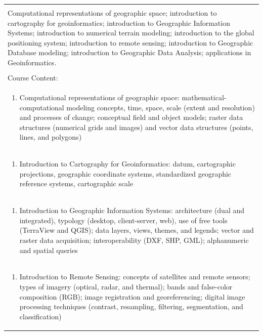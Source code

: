 \documentclass[11pt]{article}
\begin{document}
\begin{center}
\begin{longtable}{|p{4cm}|p{4cm}|p{4cm}|p{4cm}|}
\multicolumn{4}{|p{16cm}|}{}\\
\multicolumn{4}{|p{\dimexpr 16cm + 6\tabcolsep\relax}|}{Computational representations of geographic space; introduction to cartography for geoinformatics; introduction to Geographic Information Systems; introduction to numerical terrain modeling; introduction to the global positioning system; introduction to remote sensing; introduction to Geographic Database modeling; introduction to Geographic Data Analysis; applications in Geoinformatics.}\\
\multicolumn{4}{|p{16cm}|}{}\\
\hline
\multicolumn{4}{|p{16cm}|}{Course Content:}\\*
\multicolumn{4}{|p{\dimexpr 16cm + 6\tabcolsep\relax}|}{\begin{enumerate}[start=1]\item Computational representations of geographic space: mathematical-computational modeling concepts, time, space, scale (extent and resolution) and processes of change; conceptual field and object models; raster data structures (numerical grids and images) and vector data structures (points, lines, and polygons)\end{enumerate}}\\
\multicolumn{4}{|p{\dimexpr 16cm + 6\tabcolsep\relax}|}{\begin{enumerate}[start=2]\item Introduction to Cartography for Geoinformatics: datum, cartographic projections, geographic coordinate systems, standardized geographic reference systems, cartographic scale\end{enumerate}}\\
\multicolumn{4}{|p{\dimexpr 16cm + 6\tabcolsep\relax}|}{\begin{enumerate}[start=3]\item Introduction to Geographic Information Systems: architecture (dual and integrated), typology (desktop, client-server, web), use of free tools (TerraView and QGIS); data layers, views, themes, and legends; vector and raster data acquisition; interoperability (DXF, SHP, GML); alphanumeric and spatial queries\end{enumerate}}\\
\multicolumn{4}{|p{\dimexpr 16cm + 6\tabcolsep\relax}|}{\begin{enumerate}[start=4]\item Introduction to Remote Sensing: concepts of satellites and remote sensors; types of imagery (optical, radar, and thermal); bands and false-color composition (RGB); image registration and georeferencing; digital image processing techniques (contrast, resampling, filtering, segmentation, and classification)\end{enumerate}}\\

\end{longtable}
\end{center}
\end{document}
